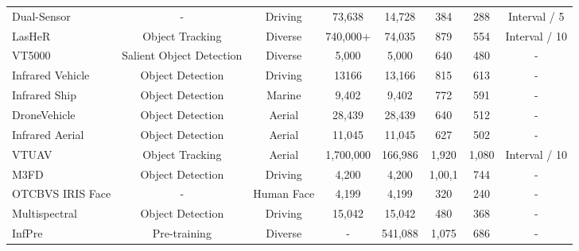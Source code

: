 \begin{table}[t]
{{\begin{tabular}{l c c c c c c c}
        Dual-Sensor \citep{dual_sensor} & - & Driving & 73,638 & 14,728 & 384 & 288 & Interval / 5 \\
        LasHeR \citep{lasher} & Object Tracking & Diverse & 740,000+ & 74,035 & 879 & 554 & Interval / 10 \\
        VT5000 \citep{vt5000} & Salient Object Detection & Diverse & 5,000 & 5,000 & 640 & 480 & - \\
        Infrared Vehicle \citep{infrared_vehicle} & Object Detection & Driving & 13166 & 13,166 & 815 & 613 & - \\
        Infrared Ship \citep{ship} & Object Detection & Marine & 9,402 & 9,402 & 772 & 591 & - \\
        DroneVehicle \citep{dronevehicle} & Object Detection & Aerial & 28,439 & 28,439 & 640 & 512 & - \\
        Infrared Aerial \citep{aerial} & Object Detection & Aerial & 11,045 & 11,045 & 627 & 502 & - \\
        VTUAV \citep{vtuav} & Object Tracking & Aerial & 1,700,000 & 166,986 & 1,920 & 1,080 & Interval / 10 \\
        M3FD \citep{m3fd} & Object Detection & Driving & 4,200 & 4,200 & 1,00,1 & 744 & - \\
        OTCBVS IRIS Face \citep{face} & - & Human Face & 4,199 & 4,199 & 320 & 240 & - \\
        Multispectral \citep{multispectral_det} & Object Detection & Driving & 15,042 & 15,042 & 480 & 368 & - \\
        \midrule
        InfPre & Pre-training & Diverse & - & 541,088 & 1,075 & 686 & - \\ 
        \bottomrule
    \end{tabular}}}
    \vspace{-3mm}
\end{table}